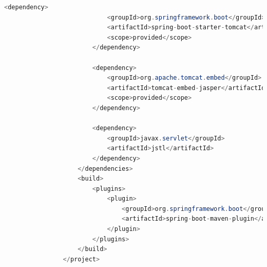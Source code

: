 \begin{lstlisting}[language = java]
                        <dependency>
                            <groupId>org.springframework.boot</groupId>
                            <artifactId>spring-boot-starter-tomcat</artifactId>
                            <scope>provided</scope>
                        </dependency>
                
                        <dependency>
                            <groupId>org.apache.tomcat.embed</groupId>
                            <artifactId>tomcat-embed-jasper</artifactId>
                            <scope>provided</scope>
                        </dependency>
                
                        <dependency>
                            <groupId>javax.servlet</groupId>
                            <artifactId>jstl</artifactId>
                        </dependency>
                    </dependencies>
                    <build>
                        <plugins>
                            <plugin>
                                <groupId>org.springframework.boot</groupId>
                                <artifactId>spring-boot-maven-plugin</artifactId>
                            </plugin>
                        </plugins>
                    </build>
                </project>    
            \end{lstlisting}
            
